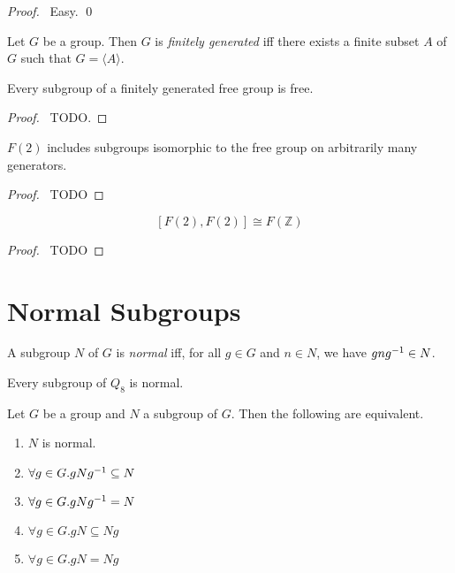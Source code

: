 \begin{proof}
\pf\ Easy. \qed
\end{proof}

\begin{df}
Let $G$ be a group. Then $G$ is \emph{finitely generated} iff there exists a finite subset $A$ of $G$ such that $G = \langle A \rangle$.
\end{df}

\begin{prop}
Every subgroup of a finitely generated free group is free.
\end{prop}

\begin{proof}
\pf\ TODO.
\end{proof}

\begin{prop}
$F(2)$ includes subgroups isomorphic to the free group on arbitrarily many generators.
\end{prop}

\begin{proof}
\pf\ TODO
\end{proof}

\begin{prop}
\[ [F(2),F(2)] \cong F(\mathbb{Z}) \]
\end{prop}

\begin{proof}
\pf\ TODO
\end{proof}

\section{Normal Subgroups}

\begin{df}
A subgroup $N$ of $G$ is \emph{normal} iff, for all $g \in G$ and $n \in N$, we have $gn{g}^{-1} \in N$.
\end{df}

\begin{ex}
Every subgroup of $Q_8$ is normal.
\end{ex}

\begin{prop}
Let $G$ be a group and $N$ a subgroup of $G$. Then the following are equivalent.
\begin{enumerate}
\item $N$ is normal.
\item $\forall g \in G. g N {g}^{-1} \subseteq N$
\item $\forall g \in G. g N {g}^{-1} = N$
\item $\forall g \in G. g N \subseteq N g$
\item $\forall g \in G. gN = Ng$
\end{enumerate}
\end{prop}

